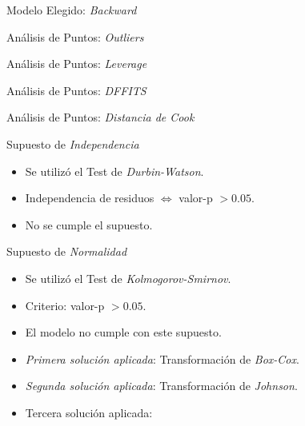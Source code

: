 \documentclass[11pt]{beamer}
\begin{document}
\begin{frame}{Modelo Elegido: \textit{Backward}}

\end{frame}

\begin{frame}{Análisis de Puntos: \textit{Outliers}}

\end{frame}

\begin{frame}{Análisis de Puntos: \textit{Leverage}}

\end{frame}

\begin{frame}{Análisis de Puntos: \textit{DFFITS}}

\end{frame}


\begin{frame}{Análisis de Puntos: \textit{Distancia de Cook}}

\end{frame}

\begin{frame}{Supuesto de \textit{Independencia}}
	\begin{itemize}
		\item Se utilizó el Test de \textit{Durbin-Watson}.
		\pause
		\item Independencia de residuos $\Leftrightarrow$ valor-p $>\mathbf{0.05}$.
		\pause
		\item No se cumple el supuesto.
	\end{itemize}
\end{frame}

\begin{frame}{Supuesto de \textit{Normalidad}}
	\begin{itemize}
		\item Se utilizó el Test de \textit{Kolmogorov-Smirnov}.
		\pause
		\item Criterio: valor-p $>\mathbf{0.05}$.
		\pause
		\item El modelo no cumple con este supuesto.
		\pause
		\item \textit{Primera solución aplicada}: Transformación de \textit{Box-Cox}.
		\pause
		\item \textit{Segunda solución aplicada}: Transformación de \textit{Johnson}.
		\pause
		\item Tercera solución aplicada:
	\end{itemize}
\end{frame}
\end{document}
